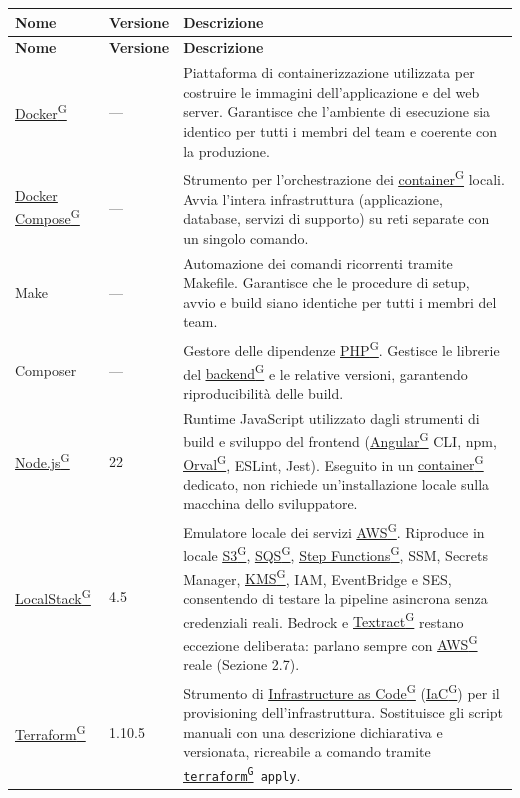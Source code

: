 \documentclass[a4paper,12pt]{article}
\providecommand{\glslink}[2]{\href{https://alittlebyte-19.github.io/Documentazione/glossario.html\#gls-#1}{\underline{#2}\textsuperscript{\scriptsize G}}}
\begin{document}
\renewcommand{\arraystretch}{1.3}
{\small
\setlength{\LTleft}{0pt}
\setlength{\LTright}{0pt}
\begin{longtable}{|p{3.5cm}|p{1.8cm}|p{9.2cm}|}
    \hline
    \rowcolor{gray!20}
    \textbf{Nome} & \textbf{Versione} & \textbf{Descrizione} \\
    \hline
    \endfirsthead
    \hline
    \rowcolor{gray!20}
    \textbf{Nome} & \textbf{Versione} & \textbf{Descrizione} \\
    \hline
    \endhead
    \glslink{docker}{Docker} & --- & Piattaforma di containerizzazione utilizzata per costruire le immagini dell'applicazione e del web server. Garantisce che l'ambiente di esecuzione sia identico per tutti i membri del team e coerente con la produzione. \\
    \hline
    \glslink{docker-compose}{Docker Compose} & --- & Strumento per l'orchestrazione dei \glslink{container}{container} locali. Avvia l'intera infrastruttura (applicazione, database, servizi di supporto) su reti separate con un singolo comando. \\
    \hline
    Make & --- & Automazione dei comandi ricorrenti tramite Makefile. Garantisce che le procedure di setup, avvio e build siano identiche per tutti i membri del team. \\
    \hline
    Composer & --- & Gestore delle dipendenze \glslink{php}{PHP}. Gestisce le librerie del \glslink{backend}{backend} e le relative versioni, garantendo riproducibilità delle build. \\
    \hline
    \glslink{node-js}{Node.js} & 22 & Runtime JavaScript utilizzato dagli strumenti di build e sviluppo del frontend (\glslink{angular}{Angular} CLI, npm, \glslink{orval}{Orval}, ESLint, Jest). Eseguito in un \glslink{container}{container} dedicato, non richiede un'installazione locale sulla macchina dello sviluppatore. \\
    \hline
    \glslink{localstack}{LocalStack} & 4.5 & Emulatore locale dei servizi \glslink{aws}{AWS}. Riproduce in locale \glslink{s3-simple-storage-service}{S3}, \glslink{sqs-simple-queue-service}{SQS}, \glslink{step-functions}{Step Functions}, SSM, Secrets Manager, \glslink{kms-key-management-service}{KMS}, IAM, EventBridge e SES, consentendo di testare la pipeline asincrona senza credenziali reali. Bedrock e \glslink{textract}{Textract} restano eccezione deliberata: parlano sempre con \glslink{aws}{AWS} reale (Sezione 2.7). \\
    \hline
    \glslink{terraform}{Terraform} & 1.10.5 & Strumento di \glslink{iac-infrastructure-as-code}{Infrastructure as Code} (\glslink{iac-infrastructure-as-code}{IaC}) per il provisioning dell'infrastruttura. Sostituisce gli script manuali con una descrizione dichiarativa e versionata, ricreabile a comando tramite \texttt{\glslink{terraform}{terraform} apply}. \\

\end{longtable}}
\end{document}
